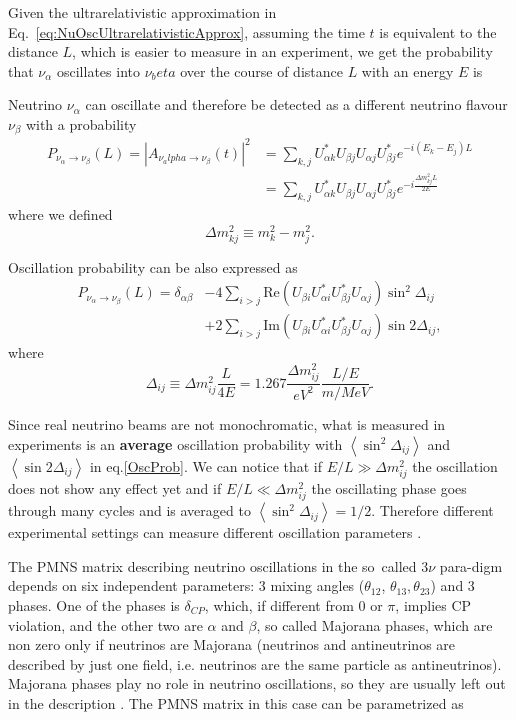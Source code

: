 Given the ultrarelativistic approximation in Eq.~\ref{eq:NuOscUltrarelativisticApprox}, assuming the time $t$ is equivalent to the distance $L$, which is easier to measure in an experiment, we get the probability that $\nu_\alpha$ oscillates into $\nu_beta$ over the course of distance $L$ with an energy $E$ is

Neutrino $\nu_{\alpha}$ can oscillate and therefore be detected as a different neutrino flavour $\nu_{\beta}$ with a probability
\begin{align}
P_{\nu_{\alpha}\rightarrow\nu_{\beta}}\left( L\right) =
\left|A_{\nu_alpha\rightarrow\nu_\beta}\left(t\right)\right|^2 &=
\sum_{k, j}U_{\alpha k}^*U_{\beta j}U_{\alpha j}U_{\beta j}^*e^{-i\left(E_k-E_j\right)L}\\
&= \sum_{k, j}U_{\alpha k}^*U_{\beta j}U_{\alpha j}U_{\beta j}^*e^{-i\frac{\Delta m_{kj}^2 L}{2E}}
\end{align}
where we defined
\begin{equation}\label{Deltamsq}
\Delta m_{kj}^{2}\equiv m_{k}^{2}-m_{j}^{2}.
\end{equation}

Oscillation probability can be also expressed as
\begin{align}\label{OscProb}
P_{\nu_{\alpha}\rightarrow\nu_{\beta}}\left( L\right)= \delta_{\alpha\beta}
& -4\sum_{i>j}\text{Re} \left( U_{\beta i}U_{\alpha i}^{*} U_{\beta j}^{*}U_{\alpha j}\right)
\sin^{2}\Delta_{ij}\nonumber \\
& +2\sum_{i>j} \text{Im} \left( U_{\beta i}U_{\alpha i}^{*}U_{\beta j}^{*}U_{\alpha j}\right) \sin 2\Delta_{ij},
\end{align}
where\cite{Gonzalez-GarciaNuMassesAndMixing.pdf} \[\Delta_{ij}\equiv\Delta m_{ij}^{2}\frac{L}{4E}=1.267\frac{\Delta m_{ij}^{2}}{\unit{eV^2}}\frac{L/E}{\unit{m}/\unit{MeV}} .\]

Since real neutrino beams are not monochromatic, what is measured in experiments is an \textbf{average} oscillation probability with $\left\langle \sin^{2}\Delta_{ij}\right\rangle$ and $\left\langle\sin2\Delta_{ij}\right\rangle $ in eq.\ref{OscProb}. We can notice that if $E/L\gg\Delta m_{ij}^{2}$ the oscillation does not show any effect yet and if $E/L\ll\Delta m_{ij}^2$ the oscillating phase goes through many cycles and is averaged to $\left\langle \sin^{2}\Delta_{ij}\right\rangle=1/2$. Therefore different experimental settings can measure different oscillation parameters \cite{PDG.pdf}.

The PMNS matrix describing neutrino oscillations in the so~called $3\nu$ para-digm depends on six independent parameters: 3 mixing angles ($\theta_{12}$, $\theta_{13}, \theta_{23}$) and 3 phases. One of the phases is $\delta_{CP}$, which, if different from 0 or $\pi$, implies CP violation, and the other two are $\alpha$ and $\beta$, so called Majorana phases, which are non zero only if neutrinos are Majorana (neutrinos and antineutrinos are described by just one field, i.e. neutrinos are the same particle as antineutrinos). Majorana phases play no role in neutrino oscillations, so they are usually left out in the description \cite{PDG.pdf}. The PMNS matrix in this case can be parametrized as

